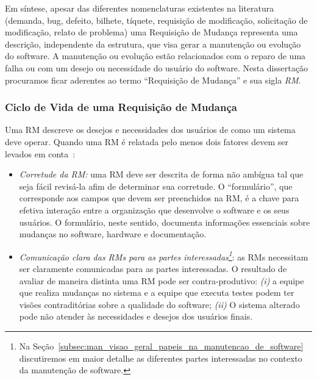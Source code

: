 Em síntese, apesar das diferentes nomenclaturas existentes na literatura
(demanda, bug, defeito, bilhete, tíquete, requisição de modificação, solicitação
de modificação, relato de problema) uma Requisição de Mudança representa uma
descrição, independente da estrutura, que visa gerar a manutenção ou evolução do
software. A manutenção ou evolução estão relacionados com o reparo de uma falha
ou com um desejo ou necessidade do usuário do software. Nesta dissertação
procuramos ficar aderentes ao termo ``Requisição de Mudança'' e sua sigla
\textit{RM}.

\subsubsection{Ciclo de Vida de uma Requisição de Mudança}\label{sub:fluxo_de_trabalho_requisicao_mudanca}

Uma RM descreve os desejos e necessidades dos usuários de como um sistema deve
operar. Quando uma RM é relatada pelo menos dois fatores devem ser levados em
conta~\cite{tripathy2014software}:

\begin{itemize}
    \item \textit{Corretude da RM:} uma RM deve ser descrita de forma não
        ambígua tal que seja fácil revisá-la afim de determinar sua corretude. O
        ``formulário'', que corresponde aos campos que devem ser preenchidos na
        RM, é a chave para efetiva interação entre a organização que desenvolve
        o software e os seus usuários. O formulário, neste sentido, documenta
        informações essenciais sobre mudanças no software, hardware e
        documentação.
   \item \textit{Comunicação clara das RMs para as partes
           interessadas\footnote{Na
               Seção~\ref{subsec:man_visao_geral_papeis_na_manutencao_de_software}
               discutiremos em maior detalhe as diferentes partes interessadas
               no contexto da manutenção de software.}}: as RMs necessitam ser
       claramente comunicadas para as partes interessadas. O resultado de
       avaliar de maneira distinta uma RM pode ser contra-produtivo:
       \textit{(i)} a equipe que realiza mudanças no sistema e a equipe que
       executa testes podem ter visões contraditórias sobre a qualidade do
       software; \textit{(ii)} O sistema alterado pode não atender às
       necessidades e desejos dos usuários finais.
\end{itemize}

